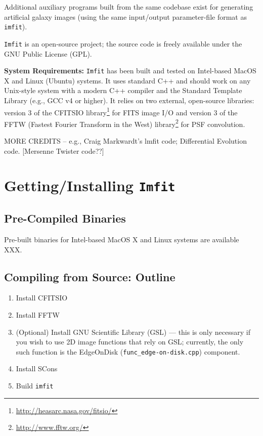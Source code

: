 \documentclass[10pt]{article}
\newcommand{\imfit}{\texttt{imfit}}
\newcommand{\Imfit}{\texttt{Imfit}}
\begin{document}
Additional auxiliary programs built from the same codebase exist for
generating artificial galaxy images (using the same input/output
parameter-file format as \imfit{}).

\Imfit{} is an open-source project; the source code is freely available
under the GNU Public License (GPL).


\bigskip

\textbf{System Requirements:} \Imfit{} has been built and tested on
Intel-based MacOS X and Linux (Ubuntu) systems. It uses standard C++ and
should work on any Unix-style system with a modern C++ compiler and the
Standard Template Library (e.g., GCC v4 or higher). It relies on two
external, open-source libraries: version 3 of the CFITSIO
library\footnote{\url{http://heasarc.nasa.gov/fitsio/}} for FITS image I/O and
version 3 of the FFTW (Fastest Fourier Transform in the West)
library\footnote{\url{http://www.fftw.org/}} for PSF convolution.

MORE CREDITS -- e.g., Craig Markwardt's lmfit code; Differential Evolution
code.  [Mersenne Twister code??]



\section{Getting/Installing \Imfit{}}

\subsection{Pre-Compiled Binaries}

Pre-built binaries for Intel-based MacOS X and Linux systems are available XXX.


\subsection{Compiling from Source: Outline}

\begin{enumerate}
\item Install CFITSIO

\item Install FFTW

\item (Optional) Install GNU Scientific Library (GSL) --- this is only necessary
if you wish to use 2D image functions that rely on GSL; currently, the only
such function is the EdgeOnDisk (\texttt{func\_edge-on-disk.cpp}) component.

\item Install SCons

\item Build \imfit{}

\end{enumerate}
\end{document}
